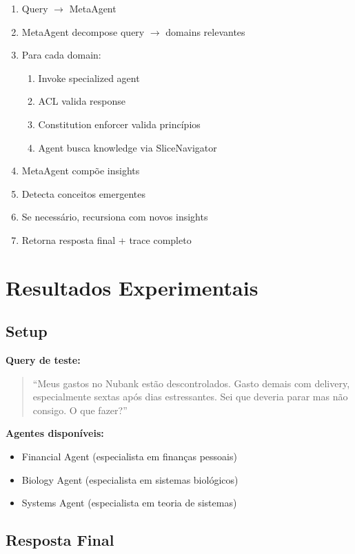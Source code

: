 \documentclass[11pt]{article}
\begin{document}
\begin{enumerate}
    \item Query $\rightarrow$ MetaAgent
    \item MetaAgent decompose query $\rightarrow$ domains relevantes
    \item Para cada domain:
    \begin{enumerate}
        \item Invoke specialized agent
        \item ACL valida response
        \item Constitution enforcer valida princípios
        \item Agent busca knowledge via SliceNavigator
    \end{enumerate}
    \item MetaAgent compõe insights
    \item Detecta conceitos emergentes
    \item Se necessário, recursiona com novos insights
    \item Retorna resposta final + trace completo
\end{enumerate}

\section{Resultados Experimentais}

\subsection{Setup}

\textbf{Query de teste:}

\begin{quote}
``Meus gastos no Nubank estão descontrolados. Gasto demais com delivery, especialmente sextas após dias estressantes. Sei que deveria parar mas não consigo. O que fazer?''
\end{quote}

\textbf{Agentes disponíveis:}
\begin{itemize}
    \item Financial Agent (especialista em finanças pessoais)
    \item Biology Agent (especialista em sistemas biológicos)
    \item Systems Agent (especialista em teoria de sistemas)
\end{itemize}

\subsection{Resposta Final}
\end{document}
